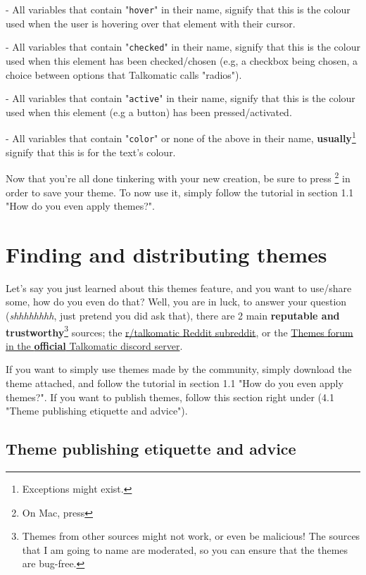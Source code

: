 \documentclass{article}
\begin{document}
- All variables that contain "\texttt{hover}" in their name, signify that this is the colour used when the user is hovering over that element with their cursor.

- All variables that contain "\texttt{checked}" in their name, signify that this is the colour used when this element has been checked/chosen (e.g, a checkbox being chosen, a choice between options that Talkomatic calls "radios").

- All variables that contain "\texttt{active}" in their name, signify that this is the colour used when this element (e.g a button) has been pressed/activated.

- All variables that contain "\texttt{color}" or none of the above in their name, \textbf{usually}\footnote{Exceptions might exist.} signify that this is for the text's colour.

Now that you're all done tinkering with your new creation, be sure to press \footnote{On Mac, press } in order to save your theme. To now use it, simply follow the tutorial in section 1.1 "How do you even apply themes?".
\clearpage

\section{Finding and distributing themes}

Let's say you just learned about this themes feature, and you want to use/share some, how do you even do that?
Well, you are in luck, to answer your question (\textit{shhhhhhhh}, just pretend you did ask that), there are 2 main \textbf{reputable and trustworthy}\footnote{Themes from other sources might not work, or even be malicious! The sources that I am going to name are moderated, so you can ensure that the themes are bug-free.} sources; the \href{https://reddit.com/r/talkomatic}{r/talkomatic Reddit subreddit}, or the \href{https://discord.com/channels/1252540401072607355/1275948725553860639}{Themes forum in the \textbf{official} Talkomatic discord server}.

If you want to simply use themes made by the community, simply download the theme attached, and follow the tutorial in section 1.1 "How do you even apply themes?". If you want to publish themes, follow this section right under (4.1 "Theme publishing etiquette and advice").

\subsection{Theme publishing etiquette and advice}
\end{document}
